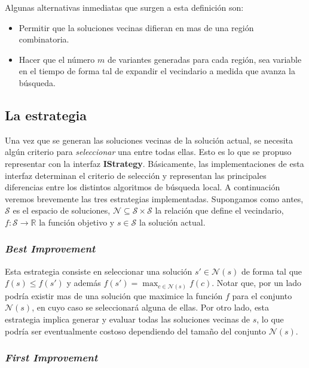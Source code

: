 Algunas alternativas inmediatas que surgen a esta definici\'on son:
\begin{itemize}
 \item Permitir que la soluciones vecinas difieran en mas de una regi\'on
combinatoria.
 \item Hacer que el n\'umero $m$ de variantes generadas para cada regi\'on, sea
variable en el tiempo de forma tal de expandir el vecindario a medida que avanza
la b\'usqueda.
\end{itemize}

\subsection{La estrategia}

Una vez que se generan las soluciones vecinas de la soluci\'on actual, se
necesita alg\'un criterio para \textit{seleccionar} una entre todas ellas. Esto
es lo que se propuso representar con la interfaz \textbf{IStrategy}.
B\'asicamente, las implementaciones de esta interfaz determinan el criterio de
selecci\'on y representan las principales diferencias entre los distintos
algoritmos de b\'usqueda local. A continuaci\'on veremos brevemente las tres
estrategias implementadas. Supongamos como antes, $\mathcal{S}$ es el espacio de
soluciones, $\mathcal{N} \subseteq \mathcal{S} \times \mathcal{S}$ la relaci\'on
que define el vecindario, $f: \mathcal{S} \rightarrow \mathbb{R}$ la funci\'on
objetivo y $s \in \mathcal{S}$ la soluci\'on actual.

\subsubsection{\textit{Best Improvement}}

Esta estrategia consiste en seleccionar una soluci\'on $s' \in \mathcal{N}(s)$
de forma tal que $f(s) \leq f(s')$ y adem\'as $f(s') = \max_{c \in
\mathcal{N}(s)} f(c)$. Notar que, por un lado podr\'ia existir mas de una
soluci\'on que maximice la funci\'on $f$ para el conjunto $\mathcal{N}(s)$, en
cuyo caso se seleccionar\'a alguna de ellas. Por otro lado, esta estrategia
implica generar y evaluar todas las soluciones vecinas de $s$, lo que
podr\'ia ser eventualmente costoso dependiendo del tama\~no del conjunto
$\mathcal{N}(s)$.

\subsubsection{\textit{First Improvement}}

